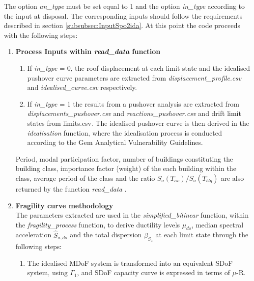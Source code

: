 The option \textit{an\_type} must be set equal to 1 and the option \textit{in\_type} according to the input at disposal. The corresponding inputs should follow the requirements described in section \ref{subsubsec:InputSpo2ida}. At this point the code proceeds with the following steps:\\

\begin{enumerate}
\item \textbf{Process Inputs within \textit{read\_data}  function}\\
\begin{enumerate}
\item If \textit{in\_type} = 0, the roof displacement at each limit state and the idealised pushover curve parameters are extracted from \textit{displacement\_profile.csv} and \textit{idealised\_curve.csv} respectively.

\item If \textit{in\_type} = 1 the results from a pushover analysis are extracted from \textit{displacements\_pushover.csv} and \textit{reactions\_pushover.csv} and drift limit states from {limits.csv}. The idealised pushover curve is then derived in the \textit{idealisation} function, where the idealisation process is conducted according to the Gem Analytical Vulnerability Guidelines.\\	\end{enumerate}

Period, modal participation factor, number of buildings constituting the building class, importance factor (weight) of the each building within the class, average period of the class and the ratio $S_a(T_{av})/S_a(T_{blg})$ are also returned by the function \textit{read\_data} .\\

\item \textbf{Fragility curve methodology}\\
The parameters extracted are used in the \textit{simplified\_bilinear} function, within the \textit{fragility\_process} function, to derive ductility levels $\mu_{ds}$, median spectral acceleration $\hat{S}_{a,ds}$ and the total dispersion $\beta_{S_a}$ at each limit state through the following steps:

\begin{enumerate}

\item The idealised MDoF system is transformed into an equivalent SDoF system, using $\Gamma_1$, and SDoF capacity curve is  expressed in terms of $\mu$-R.


\end{enumerate}
\end{enumerate}

